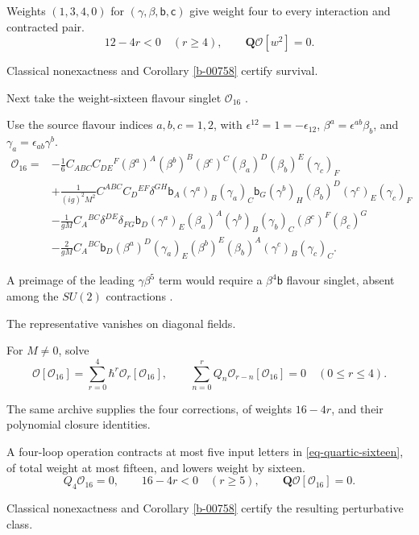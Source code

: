 \documentclass[11pt]{article}
\numberwithin{equation}{section}
\numberwithin{figure}{section}
\numberwithin{table}{section}
\begin{document}
\begin{proofbox}
Weights $(1,3,4,0)$ for $(\gamma,\beta,\mathsf b,\mathsf c)$ give weight four to every interaction and contracted pair.
\begin{equation*}
12-4r<0\quad(r\ge4),\qquad\mathbf Q\mathcal O[w^2]=0.
\end{equation*}

Classical nonexactness and Corollary \ref{b-00758} certify survival.

Next take the weight-sixteen flavour singlet $\mathcal O_{16}$ \cite[Eq. (4.53)]{CK}.

Use the source flavour indices $a,b,c=1,2$, with $\epsilon^{12}=1=-\epsilon_{12}$, $\beta^a=\epsilon^{ab}\beta_b$, and $\gamma_a=\epsilon_{ab}\gamma^b$.
\begin{equation}\label{eq-quartic-sixteen}
\begin{aligned}
\mathcal O_{16}={}&-\frac16C_{ABC}C_{DE}{}^F
(\beta^a)^A(\beta^b)^B(\beta^c)^C
(\beta_a)^D(\beta_b)^E(\gamma_c)_F\\
&+\frac1{(ig)^2M^2}C^{ABC}C_D{}^{EF}\delta^{GH}
\mathsf b_A(\gamma^a)_B(\gamma_a)_C
\mathsf b_G(\gamma^b)_H(\beta_b)^D(\gamma^c)_E(\gamma_c)_F\\
&-\frac1{gM}C_A{}^{BC}\delta^{DE}\delta_{FG}
\mathsf b_D(\gamma^a)_E(\beta_a)^A
(\gamma^b)_B(\gamma_b)_C(\beta^c)^F(\beta_c)^G\\
&-\frac2{gM}C_A{}^{BC}
\mathsf b_D(\beta^a)^D(\gamma_a)_E(\beta^b)^E
(\beta_b)^A(\gamma^c)_B(\gamma_c)_C.
\end{aligned}
\end{equation}

A preimage of the leading $\gamma\beta^5$ term would require a $\beta^4\mathsf b$ flavour singlet, absent among the $SU(2)$ contractions \cite[Section 4.4]{CK}.

The representative vanishes on diagonal fields.

For $M\ne0$, solve
\begin{equation}\label{eq-quartic-sixteen-completion}
\mathcal O[\mathcal O_{16}]=\sum_{r=0}^4\hbar^r\mathcal O_r[\mathcal O_{16}],
\qquad
\sum_{n=0}^{r}Q_n\mathcal O_{r-n}[\mathcal O_{16}]=0
\quad(0\le r\le4).
\end{equation}

The same archive supplies the four corrections, of weights $16-4r$, and their polynomial closure identities.

A four-loop operation contracts at most five input letters in \eqref{eq-quartic-sixteen}, of total weight at most fifteen, and lowers weight by sixteen.
\begin{equation*}
Q_4\mathcal O_{16}=0,\qquad16-4r<0\quad(r\ge5),\qquad\mathbf Q\mathcal O[\mathcal O_{16}]=0.
\end{equation*}

Classical nonexactness and Corollary \ref{b-00758} certify the resulting perturbative class.
\end{proofbox}
\end{document}
